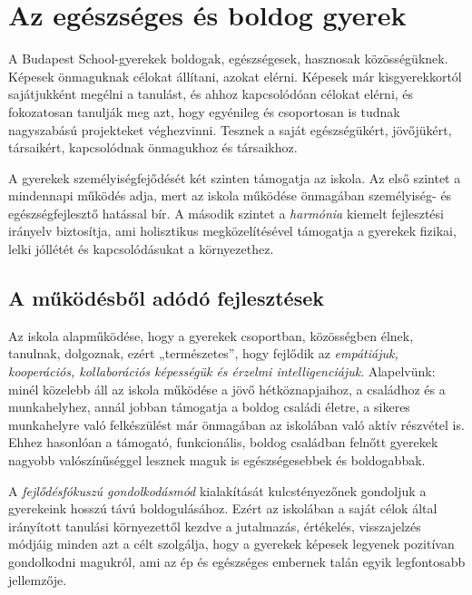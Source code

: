 \hypertarget{az-egeszseges-es-boldog-gyerek}{%
\section{Az egészséges és boldog
gyerek}\label{az-egeszseges-es-boldog-gyerek}}

A Budapest School-gyerekek boldogak, egészségesek, hasznosak
közösségüknek. Képesek önmaguknak célokat állítani, azokat elérni.
Képesek már kisgyerekkortól sajátjukként megélni a tanulást, és ahhoz
kapcsolódóan célokat elérni, és fokozatosan tanulják meg azt, hogy
egyénileg és csoportosan is tudnak nagyszabású projekteket véghezvinni.
Tesznek a saját egészségükért, jövőjükért, társaikért, kapcsolódnak
önmagukhoz és társaikhoz.

A gyerekek személyiségfejődését két szinten támogatja az iskola. Az első
szintet a mindennapi működés adja, mert az iskola működése önmagában
személyiség- és egészségfejlesztő hatással bír. A második szintet a
\emph{harmónia} kiemelt fejlesztési irányelv biztosítja, ami holisztikus
megközelítésével támogatja a gyerekek fizikai, lelki jóllétét és
kapcsolódásukat a környezethez.

\hypertarget{mukodesbol-adodo-fejlesztesek}{%
\subsection{A működésből adódó
fejlesztések}\label{mukodesbol-adodo-fejlesztesek}}

Az iskola alapműködése, hogy a gyerekek csoportban, közösségben élnek,
tanulnak, dolgoznak, ezért „természetes'', hogy fejlődik az
\emph{empátiájuk, kooperációs, kollaborációs képességük és érzelmi
intelligenciájuk}. Alapelvünk: minél közelebb áll az iskola működése
a jövő hétköznapjaihoz, a családhoz és a munkahelyhez, annál jobban
támogatja a boldog
családi életre, a sikeres munkahelyre való felkészülést már önmagában az iskolában
való aktív részvétel is. Ehhez hasonlóan a támogató,
funkcionális, boldog családban felnőtt gyerekek nagyobb valószínűséggel
lesznek maguk is egészségesebbek és boldogabbak.

A \emph{fejlődésfókuszú gondolkodásmód} kialakítását kulcstényezőnek
gondoljuk a gyerekeink hosszú távú boldogulásához. Ezért az iskolában a saját célok
által irányított tanulási környezettől kezdve a jutalmazás, értékelés,
visszajelzés módjáig minden azt a célt szolgálja, hogy a
gyerekek képesek legyenek pozitívan gondolkodni magukról, ami az
ép és egészséges embernek talán egyik legfontosabb jellemzője.

